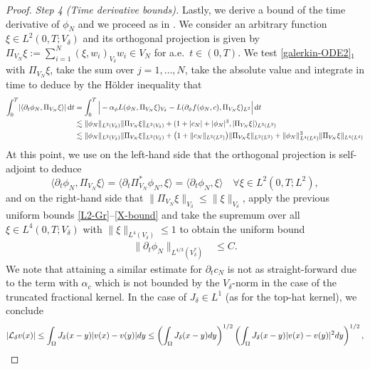 \documentclass[]{article}
\newcommand{\dt}{\,\textup{d}t}
\DeclarePairedDelimiter{\abs}{\lvert}{\rvert}
\DeclarePairedDelimiter{\norm}{\lVert}{\rVert}
\begin{document}
\begin{proof}
	\noindent\emph{Step 4 (Time derivative bounds).} Lastly, we derive a bound of the time derivative of $\phi_N$ and we proceed as in \cite[Lemma V.1.6]{boyer2012mathematical}. We consider an arbitrary function $\xi \in L^2(0,T;V_\delta)$ and its orthogonal projection is given by $\Pi_{V_N} \xi := \sum_{i=1}^N (\xi,w_i)_{V_\delta} w_i\in V_N$ for a.e.~$t \in (0,T)$. We test \eqref{galerkin-ODE2}$_1$ with $\Pi_{V_N} \xi$, take the sum over $j=1,\dots,N$, take the absolute value and integrate in time to deduce by the Hölder inequality that
	$$\begin{aligned}
		\int_0^T \abs{\langle \partial_t \phi_N, \Pi_{V_N} \xi \rangle} \dt  &= \int_0^T \Big|-\alpha_\phi L (\phi_N,\Pi_{V_N} \xi)_{V_\delta} - L (\partial_\phi f(\phi_N,c),\Pi_{V_N} \xi)_{L^2}\Big| \dt  \\
		&\lesssim  \norm{\phi_N}_{L^2(V_\delta)} \|\Pi_{V_N} \xi\|_{L^2(V_\delta)} +  (1+\abs{c_N}+\abs{\phi_N}^3,|\Pi_{V_N} \xi|)_{L^2(L^2)} \\
		&\lesssim \norm{\phi_N}_{L^2(V_\delta)} \|\Pi_{V_N} \xi\|_{L^2(V_\delta)} + \bigl(1+\norm{c_N}_{L^2(L^2)}\bigr) \|\Pi_{V_N} \xi\|_{L^2(L^2)} +   \norm{\phi_N}_{L^4(L^4)}^3 \|\Pi_{V_N} \xi\|_{L^4(L^4)} 
	\end{aligned}$$
	At this point, we use on the left-hand side that the orthogonal projection is self-adjoint to deduce 
	$$\langle \partial_t \phi_N, \Pi_{V_N} \xi \rangle = \langle \partial_t \Pi_{V_N}^* \phi_N,  \xi \rangle= \langle \partial_t  \phi_N,  \xi \rangle \quad \forall \xi \in L^2(0,T;L^2),$$
	and on the right-hand side that $\|\Pi_{V_N} \xi\|_{V_\delta} \leq \|\xi\|_{V_\delta}$, apply the previous uniform bounds \eqref{L2-Gr}--\eqref{X-bound} and take the supremum over all $\xi \in L^4(0,T;V_\delta)$ with $\|\xi\|_{L^4(V_\delta)} \leq 1$ to obtain the uniform bound
	\begin{equation} \label{Eq:Derivativebound}
		\begin{aligned} \|\partial_t \phi_N\|_{L^{4/3}(V_\delta^*)} &\leq C.
		\end{aligned}
	\end{equation}
	We note that attaining a similar estimate for $\partial_t c_N$ is not as straight-forward due to the term with $\alpha_c$ which is not bounded by the $V_\delta$-norm in the case of the truncated fractional kernel. In the case of $J_\delta \in L^1$ (as for the top-hat kernel), we conclude
	\[
	\abs{\mathcal{L}_\delta v(x)} \leq \int_{\Omega} J_\delta(x-y) \abs{v(x)-v(y)}  dy \leq \left( \int_{\Omega} J_\delta(x-y)  dy \right)^{1/2} \left( \int_{\Omega} J_\delta(x-y) \abs{v(x)-v(y)}^2  dy \right)^{1/2},
\]
\end{proof}
\end{document}
